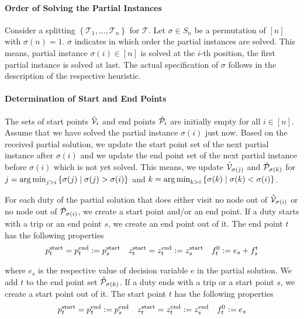 \paragraph{Order of Solving the Partial Instances} \parfill

Consider a splitting $\left\{\mathcal{T}_1,\dots,\mathcal{T}_n\right\}$ for $\mathcal{T}$. Let $\sigma\in S_n$ be a permutation of $[n]$ with $\sigma(n)=1$. $\sigma$ indicates in which order the partial instances are solved. This means, partial instance $\sigma(i)\in[n]$ is solved at the $i$-th position, the first partial instance is solved at last. The actual specification of $\sigma$ follows in the description of the respective heuristic. 

\paragraph{Determination of Start and End Points} \parfill

The sets of start points $\hat{\mathcal{V}}_i$ and end points $\hat{\mathcal{P}}_i$ are initially empty for all $i\in[n]$. Assume that we have solved the partial instance $\sigma(i)$ just now. Based on the received partial solution, we update the start point set of the next partial instance after $\sigma(i)$ and we update the end point set of the next partial instance before $\sigma(i)$ which is not yet solved. This means, we update $\hat{\mathcal{V}}_{\sigma(j)}$ and $\hat{\mathcal{P}}_{\sigma(k)}$ for ${j=\operatorname*{arg\,min}_{j>i}\left\{\sigma(j)\mid \sigma(j)>\sigma(i)\right\}}$ and ${k=\operatorname*{arg\,min}_{k>i}\left\{\sigma(k)\mid \sigma(k)<\sigma(i)\right\}}$.

For each duty of the partial solution that does either visit no node out of $\hat{\mathcal{V}}_{\sigma(i)}$ or no node out of $\hat{\mathcal{P}}_{\sigma(i)}$, we create a start point and/or an end point. If a duty starts with a trip or an end point $s$, we create an end point out of it. The end point $t$ has the following properties
\begin{align*}
	p^{\operatorname{start}}_t = p^{\operatorname{end}}_t := p^{\operatorname{start}}_s && z^{\operatorname{start}}_t = z^{\operatorname{end}}_t := z^{\operatorname{start}}_s && f_t^0 := e_s + f^{\operatorname{t}}_s
\end{align*}

where $e_s$ is the respective value of decision variable $e$ in the partial solution. We add $t$ to the end point set $\hat{\mathcal{P}}_{\sigma(k)}$. If a duty ends with a trip or a start point $s$, we create a start point out of it. The start point $t$ has the following properties
\begin{align*}
	p^{\operatorname{start}}_t = p^{\operatorname{end}}_t := p^{\operatorname{end}}_s && z^{\operatorname{start}}_t = z^{\operatorname{end}}_t := z^{\operatorname{end}}_s && f_t^0 := e_s
\end{align*}

